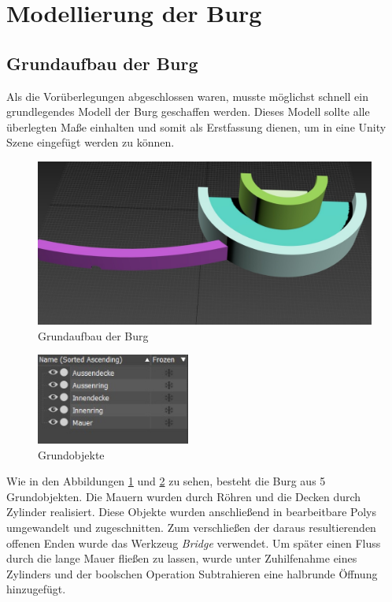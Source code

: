 \section{Modellierung der Burg}

\subsection{Grundaufbau der Burg}

Als die Vorüberlegungen abgeschlossen waren, musste möglichst schnell ein grundlegendes Modell der Burg geschaffen werden. Dieses Modell sollte alle überlegten Maße einhalten und somit als Erstfassung dienen, um in eine Unity Szene eingefügt werden zu können.

\begin{figure}[h]
	\centering
	\includegraphics[width=0.95 \linewidth]{Abbildungen/3dsMax/Grundmodell}
	\caption{Grundaufbau der Burg}
	\label{fig:Grundaufbau}
\end{figure}

\begin{figure}
	\begin{center}
		\includegraphics[width=0.45\textwidth]{Abbildungen/3dsMax/Grundhierachie}
	\end{center}
	\caption{Grundobjekte}
	\label{fig:Grundobjekte}
\end{figure}

Wie in den Abbildungen \ref{fig:Grundaufbau} und \ref{fig:Grundobjekte} zu sehen, besteht die Burg aus 5 Grundobjekten. Die Mauern wurden durch Röhren und die Decken durch Zylinder realisiert. Diese Objekte wurden anschließend in bearbeitbare Polys umgewandelt und zugeschnitten. Zum verschließen der daraus resultierenden offenen Enden wurde das Werkzeug \textit{Bridge} verwendet. Um später einen Fluss durch die lange Mauer fließen zu lassen, wurde unter Zuhilfenahme eines Zylinders und der boolschen Operation Subtrahieren eine halbrunde Öffnung hinzugefügt.

